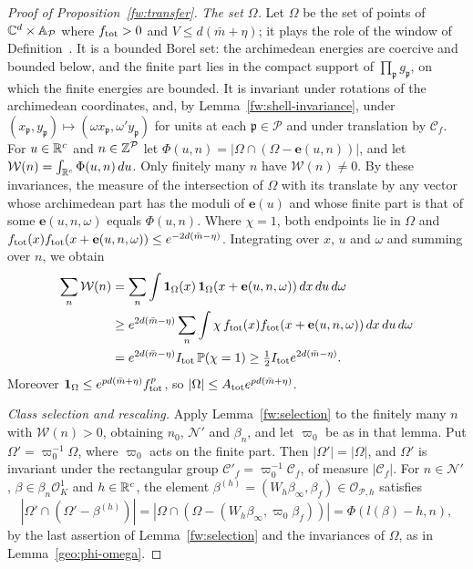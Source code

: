 \begin{proof}[Proof of Proposition~\ref{fw:transfer}]
\emph{The set $\Omega$.} Let $\Omega$ be the set of points of
$\mathbb C^d\times\mathbb A_{\mathcal P}$ where $f_{\rm tot}>0$ and $V\le d(\bar m+\eta)$;
it plays the role of the window of Definition~. It is a
bounded Borel set: the archimedean energies are coercive and bounded
below, and the finite part lies in the compact support of
$\prod_{\mathfrak p}g_{\mathfrak p}$, on which the finite energies are
bounded. It is invariant under rotations of the archimedean
coordinates, and, by Lemma~\ref{fw:shell-invariance}, under
$(x_{\mathfrak p},y_{\mathfrak p})\mapsto(\omega x_{\mathfrak
p},\omega'y_{\mathfrak p})$ for units at each $\mathfrak p\in\mathcal P$
and under translation by $\mathcal C_f$. For $u\in\mathbb R^c$ and
$n\in\mathbb Z^{\mathcal P}$ let $\Phi(u,n)=|\Omega\cap(\Omega-\mathbf e(u,n))|$, and
let $\mathcal W(n)=\int_{\mathbb R^c}\Phi(u,n)\,du$. Only finitely many $n$ have
$\mathcal W(n)\ne0$. By these invariances, the measure of the
intersection of $\Omega$ with its translate by any vector whose
archimedean part has the moduli of $\mathbf e(u)$ and whose finite part is
that of some $\mathbf e(u,n,\omega)$ equals $\Phi(u,n)$. Where $\chi=1$, both
endpoints lie in $\Omega$ and $f_{\rm tot}(x)f_{\rm tot}(x+\mathbf e(u,n,\omega))\le
e^{-2d(\bar m-\eta)}$. Integrating over $x$, $u$ and $\omega$ and
summing over $n$, we obtain
\[
 \begin{split}
 \sum_n\mathcal W(n)
 &=\sum_n\int\mathbf 1_\Omega(x)\,\mathbf 1_\Omega(x+\mathbf e(u,n,\omega))\,
 dx\,du\,d\omega\\
 &\ge e^{2d(\bar m-\eta)}\sum_n\int\chi\,f_{\rm tot}(x)f_{\rm tot}(x+\mathbf e(u,n,\omega))\,
 dx\,du\,d\omega\\
 &=e^{2d(\bar m-\eta)}I_{\rm tot}\,\mathbb P(\chi=1)
 \ge\tfrac12I_{\rm tot}e^{2d(\bar m-\eta)} .
 \end{split}
\]
Moreover $\mathbf 1_\Omega\le e^{pd(\bar m+\eta)}f_{\rm tot}^p$, so
$|\Omega|\le A_{\rm tot}e^{pd(\bar m+\eta)}$.

\emph{Class selection and rescaling.} Apply Lemma~\ref{fw:selection} to
the finitely many $n$ with $\mathcal W(n)>0$, obtaining $n_0$,
$\mathcal N'$ and $\beta_n$, and let $\varpi_0$ be as in that lemma.
Put $\Omega'=\varpi_0^{-1}\Omega$, where $\varpi_0$ acts on the finite
part. Then $|\Omega'|=|\Omega|$, and $\Omega'$ is invariant under the
rectangular group $\mathcal C'_f=\varpi_0^{-1}\mathcal C_f$, of measure
$|\mathcal C_f|$. For $n\in\mathcal N'$, $\beta\in\beta_n\mathcal O_K^1$
and $h\in\mathbb R^c$, the element $\beta^{(h)}=(W_h\beta_\infty,\beta_f)\in
\mathcal O_{\mathcal P,h}$ satisfies
\[
 |\Omega'\cap(\Omega'-\beta^{(h)})|=|\Omega\cap(\Omega-(W_h\beta_\infty,
 \varpi_0\beta_f))|=\Phi(l(\beta)-h,n),
\]
by the last assertion of Lemma~\ref{fw:selection} and the invariances of
$\Omega$, as in Lemma~\ref{geo:phi-omega}.


\end{proof}
